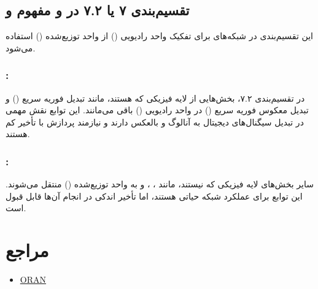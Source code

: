 \documentclass[landscape, 12pt]{report}
\begin{document}
\subsection*{تقسیم‌بندی ۷ یا ۷.۲ در  و مفهوم  و }
این تقسیم‌بندی در شبکه‌های  برای تفکیک واحد رادیویی () از واحد توزیع‌شده () استفاده می‌شود.

\subsubsection*{:}
در تقسیم‌بندی ۷.۲، بخش‌هایی از لایه فیزیکی که  هستند، مانند تبدیل فوریه سریع () و تبدیل معکوس فوریه سریع () در واحد رادیویی () باقی می‌مانند. این توابع نقش مهمی در تبدیل سیگنال‌های دیجیتال به آنالوگ و بالعکس دارند و نیازمند پردازش با تأخیر کم هستند.

\subsubsection*{:}
سایر بخش‌های لایه فیزیکی که  نیستند، مانند ، ،  و  به واحد توزیع‌شده () منتقل می‌شوند. این توابع برای عملکرد شبکه حیاتی هستند، اما تأخیر اندکی در انجام آن‌ها قابل قبول است.


\section* {مراجع}
\begin{itemize}
	\item 
	\href{https://www.youtube.com/watch?v=Z9kJ8HT\_IVM} {ORAN}
	
\end{itemize}
\end{document}
